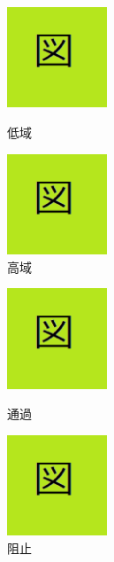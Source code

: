 \documentclass[11pt,b5paper,papersize,dvipdfmx]{jsbook}
\begin{document}
\begin{figure}[H]
  \begin{minipage}{0.33\hsize}
  \begin{center}
  \includegraphics[width=3cm]{nsmr/img/zu.png}
	\end{center}
  \caption{低域}
\end{minipage}
 \begin{minipage}{0.33\hsize}
  \begin{center}	
 \includegraphics[width=3cm]{nsmr/img/zu.png}
 \end{center}  
\caption{高域}
\end{minipage}
\end{figure}
\begin{figure}[H]
  \begin{minipage}{0.33\hsize}
  \begin{center}
  \includegraphics[width=3cm]{nsmr/img/zu.png}
	\end{center}
  \caption{通過}
\end{minipage}
 \begin{minipage}{0.33\hsize}
  \begin{center}	
 \includegraphics[width=3cm]{nsmr/img/zu.png}
 \end{center}  
\caption{阻止}
\end{minipage}
\end{figure}
\fi
\end{document}
